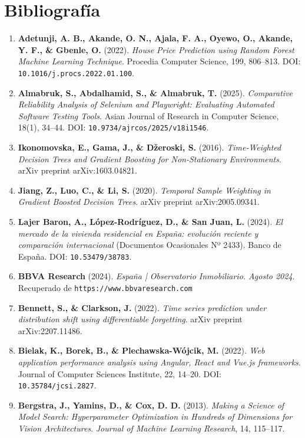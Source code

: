 \documentclass[a4paper,11pt,openany]{book}
\begin{document}
\backmatter
\chapter*{Bibliografía}
\begin{enumerate}
    \item \textbf{Adetunji, A. B., Akande, O. N., Ajala, F. A., Oyewo, O., Akande, Y. F., \& Gbenle, O.} (2022). \textit{House Price Prediction using Random Forest Machine Learning Technique}. Procedia Computer Science, 199, 806--813. DOI: \nolinkurl{10.1016/j.procs.2022.01.100}.
    \item \textbf{Almabruk, S., Abdalhamid, S., \& Almabruk, T.} (2025). \textit{Comparative Reliability Analysis of Selenium and Playwright: Evaluating Automated Software Testing Tools}. Asian Journal of Research in Computer Science, 18(1), 34--44. DOI: \nolinkurl{10.9734/ajrcos/2025/v18i1546}.
    \item \textbf{Ikonomovska, E., Gama, J., \& D\v{z}eroski, S.} (2016). \textit{Time-Weighted Decision Trees and Gradient Boosting for Non-Stationary Environments}. arXiv preprint arXiv:1603.04821.
    \item \textbf{Jiang, Z., Luo, C., \& Li, S.} (2020). \textit{Temporal Sample Weighting in Gradient Boosted Decision Trees}. arXiv preprint arXiv:2005.09341.
    \item \textbf{Lajer Baron, A., López-Rodríguez, D., \& San Juan, L.} (2024). \textit{El mercado de la vivienda residencial en España: evolución reciente y comparación internacional} (Documentos Ocasionales Nº 2433). Banco de España. DOI: \nolinkurl{10.53479/38783}.
    \item \textbf{BBVA Research} (2024). \textit{España | Observatorio Inmobiliario. Agosto 2024}. Recuperado de \nolinkurl{https://www.bbvaresearch.com}
    \item \textbf{Bennett, S., \& Clarkson, J.} (2022). \textit{Time series prediction under distribution shift using differentiable forgetting}. arXiv preprint arXiv:2207.11486.
    \item \textbf{Bielak, K., Borek, B., \& Plechawska-Wójcik, M.} (2022). \textit{Web application performance analysis using Angular, React and Vue.js frameworks}. Journal of Computer Sciences Institute, 22, 14--20. DOI: \nolinkurl{10.35784/jcsi.2827}.
    \item \textbf{Bergstra, J., Yamins, D., \& Cox, D. D.} (2013). \textit{Making a Science of Model Search: Hyperparameter Optimization in Hundreds of Dimensions for Vision Architectures}. \textit{Journal of Machine Learning Research}, 14, 115--117.

\end{enumerate}
\end{document}
